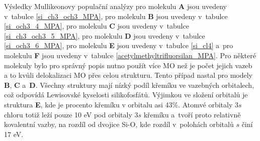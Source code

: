 \documentclass[
digital, %
table,   %
lof,     %
lot,     %
oneside,
]{fithesis3}
\begin{document}
\begin{figure}
\begin{center}
\label{prehled_nbo_si_ch3_oac_3}
\end{center}
\end{figure}

Výsledky Mullikeonovy populační analýzy pro molekulu \textbf{A} jsou uvedeny v~tabulce \ref{si_ch3_och3_MPA}, pro molekulu \textbf{B} jsou uvedeny v~tabulce \ref{si_och3_4_MPA}, pro molekulu \textbf{C} jsou uvedeny v~tabulce \ref{si_ch3_och3_5_MPA}, pro molekulu \textbf{D} jsou uvedeny v~tabulce \ref{si_och3_6_MPA}, pro molekulu \textbf{E} jsou uvedeny v~tabulce \ref{si_cl4} a~pro molekulu \textbf{F} jsou uvedeny v~tabulce \ref{acetylmethyltrifluorsilan_MPA}. Pro některé molekuly bylo pro správný popis nutno použít více MO než je počet jejich vazeb a to kvůli delokalizaci MO přes celou strukturu. Tento případ nastal pro modely \textbf{B}, \textbf{C} a~\textbf{D}. Všechny struktury mají nízký podíl křemíku ve vazebných orbitalech, což odpovídá Lewisovské kyselosti silikofosfátů. Výjimkou ve složení orbitalů je struktura \textbf{E}, kde je procento křemíku v orbitalu asi 43\%. Atomvé orbitaly $3s$ chloru totiž leží pouze 10 eV pod orbitaly $3s$ křemíku a~tvoří proto relativně kovalentní vazby, na rozdíl od dvojice Si-O, kde rozdíl v~polohách orbitalů $s$ činí 17 eV.
\end{document}
